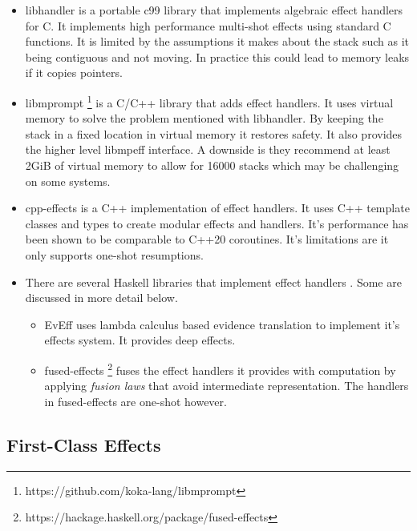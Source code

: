 \documentclass[logo,bsc,singlespacing,parskip]{infthesis}
\begin{document}
\begin{itemize}
        \item{libhandler \cite{leijen2017implementing} is a portable c99 library
that implements algebraic effect handlers for C. It implements high performance
multi-shot effects using standard C functions. It is limited by the assumptions
it makes about the stack such as it being contiguous and not moving. In practice
this could lead to memory leaks if it copies pointers.}
        \item{libmprompt \footnote{https://github.com/koka-lang/libmprompt} is a
C/C++ library that adds effect handlers. It uses virtual memory to solve the
problem mentioned with libhandler. By keeping the stack in a fixed location in
virtual memory it restores safety. It also provides the higher level libmpeff
interface. A downside is they recommend at least 2GiB of virtual memory to
allow for 16000 stacks which may be challenging on some systems.}
        \item{cpp-effects \cite{DBLP:journals/pacmpl/GhicaLBP22} is a C++
implementation of effect handlers. It uses C++ template classes and types to
create modular effects and handlers. It's performance has been shown to be
comparable to C++20 coroutines. It's limitations are it only supports one-shot
        resumptions.}
        \item{There are several Haskell libraries that implement effect handlers
\cite{DBLP:conf/haskell/XieL20, DBLP:conf/haskell/KiselyovI15,
DBLP:conf/haskell/WuSH14}. Some are discussed in more detail below.}
        \begin{itemize}
          \item{EvEff uses lambda calculus based evidence translation to
implement it's effects system. It provides deep effects.}
          \item{fused-effects
\footnote{https://hackage.haskell.org/package/fused-effects} fuses the effect
handlers it provides with computation by applying \emph{fusion laws} that avoid
intermediate representation. The handlers in fused-effects are one-shot
however.}
        \end{itemize}
\end{itemize}

\subsection{First-Class Effects}
\end{document}
